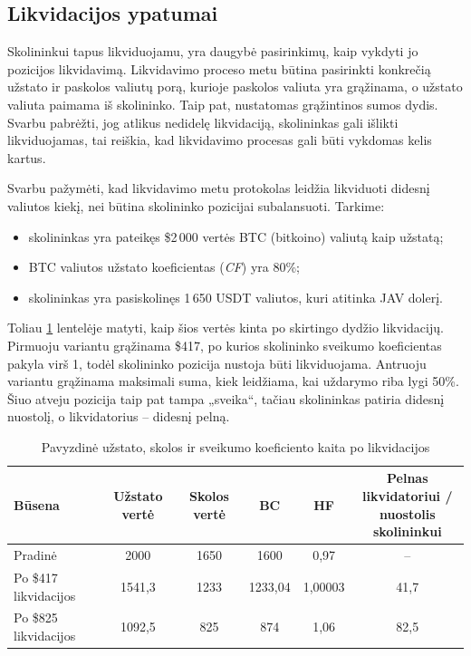 \documentclass[]{VUMIFTemplateClass}
\begin{document}
\subsection{Likvidacijos ypatumai}
\label{sec:likivdacijos_ypatumai}

Skolininkui tapus likviduojamu, yra daugybė pasirinkimų, kaip vykdyti jo pozicijos likvidavimą. Likvidavimo proceso metu būtina pasirinkti konkrečią užstato ir paskolos valiutų porą, kurioje paskolos valiuta yra grąžinama, o užstato valiuta paimama iš skolininko. Taip pat, nustatomas grąžintinos sumos dydis. Svarbu pabrėžti, jog atlikus nedidelę likvidaciją, skolininkas gali išlikti likviduojamas, tai reiškia, kad likvidavimo procesas gali būti vykdomas kelis kartus.

Svarbu pažymėti, kad likvidavimo metu protokolas leidžia likviduoti didesnį valiutos kiekį, nei būtina skolininko pozicijai subalansuoti. Tarkime:
\begin{itemize}
  \item skolininkas yra pateikęs \$2\,000 vertės BTC (bitkoino) valiutą kaip užstatą;
  \item BTC valiutos užstato koeficientas (\textit{CF}) yra 80\%;
  \item skolininkas yra pasiskolinęs 1\,650 USDT valiutos, kuri atitinka JAV dolerį.
\end{itemize}

Toliau \ref{tab:likvidacijos_pav} lentelėje matyti, kaip šios vertės kinta po skirtingo dydžio likvidacijų.
Pirmuoju variantu grąžinama \$417, po kurios skolininko sveikumo koeficientas pakyla virš 1, todėl
skolininko pozicija nustoja būti likviduojama.
Antruoju variantu grąžinama maksimali suma, kiek leidžiama, kai uždarymo riba lygi 50\%.
Šiuo atveju pozicija taip pat tampa „sveika“, tačiau skolininkas patiria didesnį nuostolį, o likvidatorius – didesnį pelną.

\begin{table}[h!]
  \centering
  \caption{Pavyzdinė užstato, skolos ir sveikumo koeficiento kaita po likvidacijos}
  \begin{tabular}{lccccc}
  \hline
  \textbf{Būsena} 
  & \textbf{Užstato vertė}
  & \textbf{Skolos vertė}
  & \textbf{BC}
  & \textbf{HF}
  & \makecell{\textbf{Pelnas likvidatoriui /}\\ \textbf{nuostolis skolininkui}} \\ 
  \hline
  Pradinė                
  & 2000      
  & 1650      
  & 1600      
  & 0,97    
  & --         \\
  
  Po \$417 likvidacijos  
  & 1541,3    
  & 1233      
  & 1233,04   
  & 1,00003   
  & 41,7       \\
  
  Po \$825 likvidacijos  
  & 1092,5    
  & 825       
  & 874       
  & 1,06      
  & 82,5       \\
  \hline
  \end{tabular}
  \label{tab:likvidacijos_pav}
  \end{table}
\end{document}
